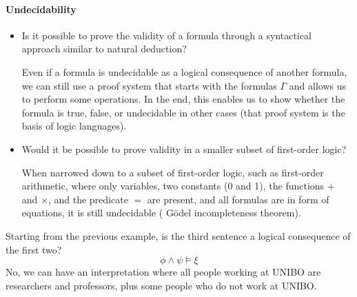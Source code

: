 \documentclass{article}
\begin{document}
\paragraph{Undecidability}
\begin{itemize}
    \item Is it possible to prove the validity of a formula through a syntactical
        approach similar to natural deduction?

        Even if a formula is undecidable as a logical consequence of another formula,
        we can still use a proof system that starts with the formulas $\Gamma$ and
        allows us to perform some operations. In the end, this enables us to show
        whether the formula is true, false, or undecidable in other cases
        (that proof system is the basis of logic languages).

    \item Would it be possible to prove validity in a smaller subset of first-order
        logic?

        When narrowed down to a subset of first-order logic, such as first-order
        arithmetic, where only variables, two constants (0 and 1), the functions $+$
        and $\times$, and the predicate $=$ are present, and all formulas are in form
        of equations, it is still undecidable ({\color{green} Gödel incompleteness
        theorem}).
\end{itemize}

\begin{exam}
   Starting from the previous example, is the third sentence a logical
   consequence of the first two?
   $$\phi\land\psi\models\xi$$
   No, we can have an interpretation where all people working at UNIBO are
   researchers and professors, plus some people who do not work at UNIBO.
\end{exam}
\end{document}
